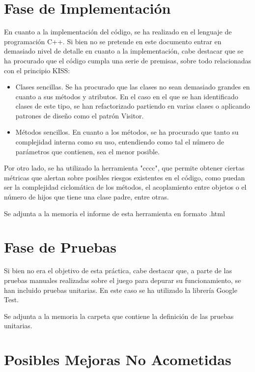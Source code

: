 \documentclass[11pt]{article}
\begin{document}
\pagebreak

\section{Fase de Implementación}

En cuanto a la implementación del código, se ha realizado en el lenguaje de programación C++. Si bien no se pretende en este documento entrar en demasiado nivel de detalle en cuanto a la implementación, cabe destacar que se ha procurado que el código cumpla una serie de premisas, sobre todo relacionadas con el principio KISS:
\begin{itemize}
\item{Clases sencillas}. Se ha procurado que las clases no sean demasiado grandes en cuanto a sus métodos y atributos. En el caso en el que se han identificado clases de este tipo, se han refactorizado partiendo en varias clases o aplicando patrones de diseño como el patrón Visitor.
\item{Métodos sencillos}. En cuanto a los métodos, se ha procurado que tanto su complejidad interna como su uso, entendiendo como tal el número de parámetros que contienen, sea el menor posible.
\end{itemize}

Por otro lado, se ha utilizado la herramienta "cccc", que permite obtener ciertas métricas que alertan sobre posibles riesgos existentes en el código, como puedan ser la complejidad ciclomática de los métodos, el acoplamiento entre objetos o el número de hijos que tiene una clase padre, entre otras. 

Se adjunta a la memoria el informe de esta herramienta en formato .html

\pagebreak

\section{Fase de Pruebas}

Si bien no era el objetivo de esta práctica, cabe destacar que, a parte de las pruebas manuales realizadas sobre el juego para depurar su funcionamiento, se han incluido pruebas unitarias. En este caso se ha utilizado la librería Google Test.

Se adjunta a la memoria la carpeta que contiene la definición de las pruebas unitarias.

\pagebreak

\section{Posibles Mejoras No Acometidas}
\end{document}
